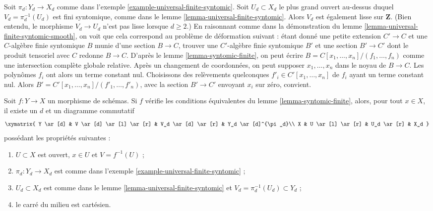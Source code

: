 \begin{remark}
\label{remark-universal-finite-syntomic-smooth-top}
Soit $\pi_d : Y_d \to X_d$ comme dans
l'exemple \ref{example-universal-finite-syntomic}.
Soit $U_d \subset X_d$ le plus grand ouvert au-dessus duquel
$V_d = \pi_d^{-1}(U_d)$ est fini syntomique, comme dans le
lemme \ref{lemma-universal-finite-syntomic}.
Alors $V_d$ est également lisse sur $\mathbf{Z}$.
(Bien entendu, le morphisme $V_d \to U_d$ n'est pas lisse lorsque $d \geq 2$.)
En raisonnant comme dans la démonstration du lemme \ref{lemma-universal-finite-syntomic-smooth},
on voit que cela correspond au problème de déformation
suivant : étant donné une petite extension $C' \to C$ et
une $C$-algèbre finie syntomique $B$ munie d'une section $B \to C$,
trouver une $C'$-algèbre finie syntomique $B'$ et une section $B' \to C'$
dont le produit tensoriel avec $C$ redonne $B \to C$.
D'après le lemme \ref{lemma-syntomic-finite}, on peut écrire
$B = C[x_1, \ldots, x_n]/(f_1, \ldots, f_n)$ comme
une intersection complète globale relative.
Après un changement de coordonnées, on peut supposer
$x_1, \ldots, x_n$ dans le noyau de $B \to C$.
Les polynômes $f_i$ ont alors un terme constant nul.
Choisissons des relèvements quelconques $f'_i \in C'[x_1, \ldots, x_n]$ de $f_i$
ayant un terme constant nul. Alors
$B' = C'[x_1, \ldots, x_n]/(f'_1, \ldots, f'_n)$,
avec la section $B' \to C'$ envoyant $x_i$ sur zéro, convient.
\end{remark}

\begin{lemma}
\label{lemma-locally-comes-from-universal-finite}
Soit $f : Y \to X$ un morphisme de schémas. Si $f$ vérifie les conditions équivalentes
du lemme \ref{lemma-syntomic-finite}, alors, pour tout
$x \in X$, il existe un $d$ et un diagramme commutatif
$$
\xymatrix{
Y \ar[d] &
V \ar[d] \ar[l] \ar[r] &
V_d \ar[d] \ar[r] &
Y_d \ar[d]^{\pi_d}\\
X &
U \ar[l] \ar[r] &
U_d \ar[r] &
X_d
}
$$
possédant les propriétés suivantes :
\begin{enumerate}
\item $U \subset X$ est ouvert, $x \in U$ et $V = f^{-1}(U)$ ;
\item $\pi_d : Y_d \to X_d$ est comme dans
l'exemple \ref{example-universal-finite-syntomic} ;
\item $U_d \subset X_d$ est comme dans le lemme \ref{lemma-universal-finite-syntomic}
et $V_d = \pi_d^{-1}(U_d) \subset Y_d$ ;
\item le carré du milieu est cartésien.
\end{enumerate}
\end{lemma}

